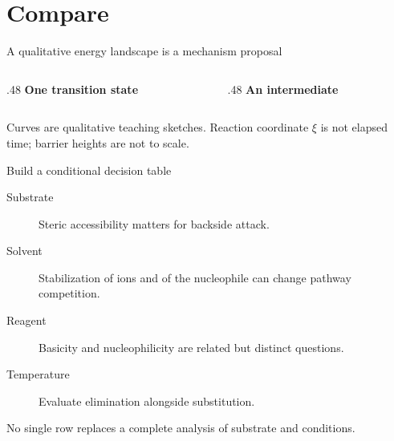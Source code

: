 \documentclass[11pt,aspectratio=169]{beamer}
\begin{document}
\section{Compare}
\begin{frame}{A qualitative energy landscape is a mechanism proposal}
\begin{columns}[T]
\begin{column}{.48\textwidth}
\centering\textbf{One transition state}
\end{column}
\begin{column}{.48\textwidth}
\centering\textbf{An intermediate}
\end{column}
\end{columns}
\small Curves are qualitative teaching sketches. Reaction coordinate $\xi$ is not elapsed time; barrier heights are not to scale.
\end{frame}
\begin{frame}{Build a conditional decision table}
\begin{description}
\item[Substrate] Steric accessibility matters for backside attack.
\item[Solvent] Stabilization of ions and of the nucleophile can change pathway competition.
\item[Reagent] Basicity and nucleophilicity are related but distinct questions.
\item[Temperature] Evaluate elimination alongside substitution.
\end{description}
No single row replaces a complete analysis of substrate and conditions.
\end{frame}
\end{document}
